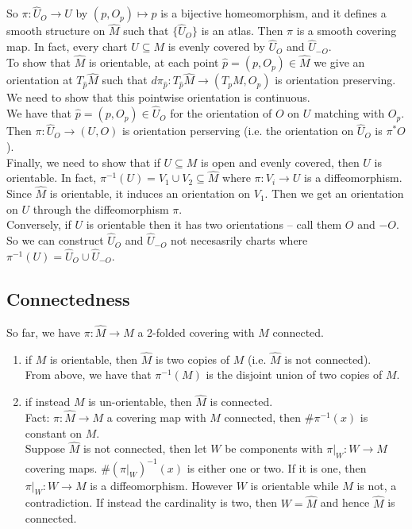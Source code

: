 \documentclass[11pt]{article}
\begin{document}
So \(\pi:\hat{U}_{O}\to U\) by \((p,O_{p})\mapsto p\) is a bijective homeomorphism, and it defines a smooth structure on \(\hat{M}\) such that \(\{\hat{U}_{O}\}\) is an atlas. Then \(\pi\) is a smooth covering map. In fact, every chart \(U\subseteq M\) is evenly covered by \(\hat{U}_{O}\) and \(\hat{U}_{-O}\).\\
To show that \(\hat{M}\) is orientable, at each point \(\hat{p}=(p,O_{p})\in\hat{M}\) we give an orientation at \(T_{\hat{p}}\hat{M}\) such that \(d\pi_{\hat{p}}:T_{\hat{p}}\hat{M}\to(T_{p}M,O_{p})\) is orientation preserving. We need to show that this pointwise orientation is continuous.\\
We have that \(\hat{p}=(p,O_{p})\in\hat{U}_{O}\) for the orientation of \(O\) on \(U\) matching with \(O_{p}\). Then \(\pi:\hat{U}_{O}\to(U,O)\) is orientation perserving (i.e. the orientation on \(\hat{U}_{O}\) is \(\pi^{*}O\)).\\
Finally, we need to show that if \(U\subseteq M\) is open and evenly covered, then \(U\) is orientable. In fact, \(\pi^{-1}(U)=V_{1}\cup V_{2}\subseteq\hat{M}\) where \(\pi:V_{i}\to U\) is a diffeomorphism. Since \(\hat{M}\) is orientable, it induces an orientation on \(V_{1}\). Then we get an orientation on \(U\) through the diffeomorphism \(\pi\).\\
Conversely, if \(U\) is orientable then it has two orientations -- call them \(O\) and \(-O\). So we can construct \(\hat{U}_{O}\) and \(\hat{U}_{-O}\) not necesasrily charts where \(\pi^{-1}(U)=\hat{U}_{O}\cup\hat{U}_{-O}\).\\
\subsection*{Connectedness}
\label{sec:org5ef4b5a}
So far, we have \(\pi:\hat{M}\to M\) a 2-folded covering with \(M\) connected.\\
\begin{enumerate}
\item if \(M\) is orientable, then \(\hat{M}\) is two copies of \(M\) (i.e. \(\hat{M}\) is not connected).\\

From above, we have that \(\pi^{-1}(M)\) is the disjoint union of two copies of \(M\).\\

\item if instead \(M\) is un-orientable, then \(\hat{M}\) is connected.\\

Fact: \(\pi:\hat{M}\to M\) a covering map with \(M\) connected, then \(\#\pi^{-1}(x)\) is constant on \(M\).\\
Suppose \(\hat{M}\) is not connected, then let \(W\) be components with \(\pi|_{W}:W\to M\) covering maps. \(\#(\pi|_{W})^{-1}(x)\) is either one or two. If it is one, then \(\pi|_{W}:W\to M\) is a diffeomorphism. However \(W\) is orientable while \(M\) is not, a contradiction. If instead the cardinality is two, then \(W=\hat{M}\) and hence \(\hat{M}\) is connected.\\
\end{enumerate}
\end{document}

